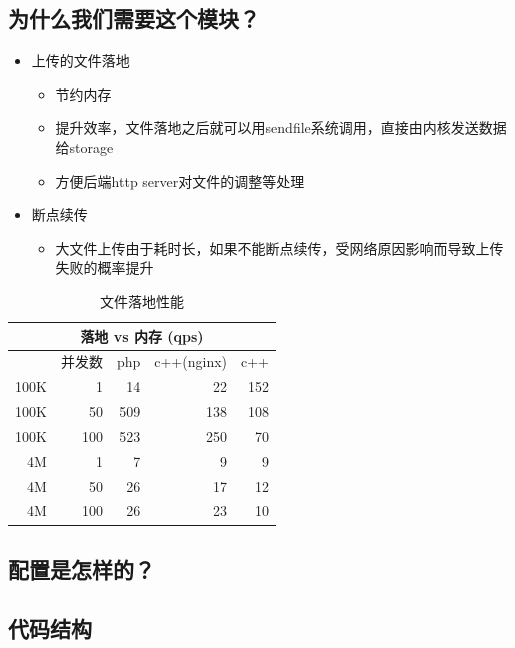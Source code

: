 \documentclass[aspectratio=169]{ctexbeamer}
\begin{document}
\subsection{为什么我们需要这个模块？}
\begin{frame}{\subsecname}
  \begin{itemize}
  \item<2-> 上传的文件落地
    \begin{itemize}
    \item<3-> 节约内存
    \item<4-> 提升效率，文件落地之后就可以用sendfile系统调用，直接由内核发送数据给storage
    \item<5-> 方便后端http server对文件的调整等处理
    \end{itemize}
  \item<6-> 断点续传
    \begin{itemize}
    \item<7-> 大文件上传由于耗时长，如果不能断点续传，受网络原因影响而导致上传失败的概率提升
    \end{itemize}
  \end{itemize}
\end{frame}

\begin{frame}{\subsecname}
  \begin{table}[h]                           
    \centering
    \begin{tabular}{ r|r|r|r|r }
      \multicolumn{5}{c}{\textbf{落地 vs 内存 (qps)}} \\ \hline
           & 并发数  &   php  & c++(nginx) & c++   \\            
      100K &  1     &    14  & 22  & 152       \\     
      100K &  50    &    509 & 138 & 108          \\     
      100K &  100   &    523 & 250 & 70         \\     
      4M &  1     &    7 & 9 & 9           \\     
      4M &  50    &    26 & 17 & 12           \\     
      4M &  100   &    26 & 23 & 10          \\     
    \end{tabular}
    \caption{文件落地性能}
    \label{tab:msg1}                            
  \end{table}
\end{frame}

\subsection{配置是怎样的？}
\begin{frame}{\subsecname}
  
\end{frame}

\subsection{代码结构}
\end{document}
